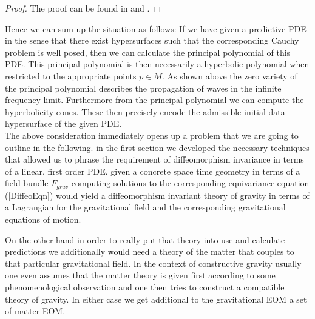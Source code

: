 \documentclass[a4paper,12pt, DIV=14, BCOR=5mm, twoside, headsepline]{scrbook}
\begin{document}
\begin{proof}
The proof can be found in \cite{Hormander1977} and \cite{Ivrii_1974}.
\end{proof}
Hence we can sum up the situation as follows: If we have given a predictive PDE in the sense that there exist hypersurfaces such that the corresponding Cauchy problem is well posed, then we can calculate the principal polynomial of this PDE. This principal polynomial is then necessarily a hyperbolic polynomial when restricted to the appropriate points $p \in M$. As shown above the zero variety of the principal polynomial describes the propagation of waves in the infinite frequency limit. Furthermore from the principal polynomial we can compute the hyperbolicity cones. These then precisely encode the admissible initial data hypersurface of the given PDE.\\ 

The above consideration immediately opens up a problem that we are going to outline in the following. in the first section we developed the necessary techniques that allowed us to phrase the requirement of diffeomorphism invariance in terms of a linear, first order PDE. given a concrete space time geometry in terms of a field bundle $F_{grav}$ computing solutions to the corresponding equivariance equation (\ref{DiffeoEqn}) would yield a diffeomorphism invariant theory of gravity in terms of a Lagrangian for the gravitational field and the corresponding gravitational equations of motion.  

On the other hand in order to really put that theory into use and calculate predictions we additionally would need a theory of the matter that couples to that particular gravitational field. In the context of constructive gravity usually one even assumes that the matter theory is given first according to some phenomenological observation and one then tries to construct a compatible theory of gravity. In either case we get additional to the gravitational EOM a set of matter EOM.
\end{document}

